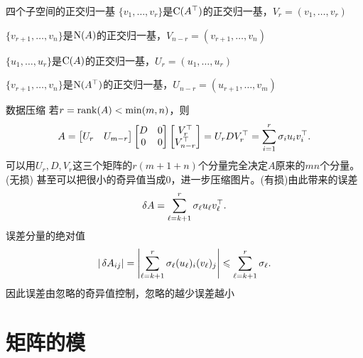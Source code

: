 \begin{example}{四个子空间的正交归一基}{}
	$\{v_1,\ldots,v_r\}$是$\operatorname{C}(A^\top)$的正交归一基，$V_r=(v_1,\ldots,v_r)$

	$\{v_{r+1},\ldots,v_n\}$是$\operatorname{N}(A)$的正交归一基，$V_{n-r}=(v_{r+1},\ldots,v_n)$

	$\{u_1,\ldots,u_r\}$是$\operatorname{C}(A)$的正交归一基，$U_r=(u_1,\ldots,u_r)$

	$\{v_{r+1},\ldots,v_n\}$是$\operatorname{N}(A^\top)$的正交归一基，$U_{n-r}=(u_{r+1},\ldots,v_m)$
\end{example}
\begin{example}{数据压缩}{}
	若$r=\operatorname{rank}(A)<\min(m,n)$，则 
	\[
		A=\begin{bmatrix}
			U_r&U_{m-r}
		\end{bmatrix}\begin{bmatrix}
			D&0\\0&0
		\end{bmatrix}\begin{bmatrix}
			V_r^\top\\V_{n-r}^\top
		\end{bmatrix}=U_rDV_r^\top=\sum_{i=1}^r\sigma_iu_iv_i^\top.
	\]
	可以用$U_r,D,V_r$这三个矩阵的$r(m+1+n)$个分量完全决定$A$原来的$mn$个分量。(无损)
	\tcblower
	甚至可以把很小的奇异值当成0，进一步压缩图片。(有损)由此带来的误差
	\[
		\mathop{}\!\delta A=\sum_{\ell=k+1}^r\sigma_\ell u_\ell v_\ell^\top.
	\]
	误差分量的绝对值
	\[
		|\mathop{}\!\delta A_{ij}|=\left\lvert\sum_{\ell=k+1}^r\sigma_\ell (u_\ell)_i (v_\ell)_j\right\rvert\leqslant\sum_{\ell=k+1}^r\sigma_\ell.
	\]
	因此误差由忽略的奇异值控制，忽略的越少误差越小
\end{example}

\section{矩阵的模}


